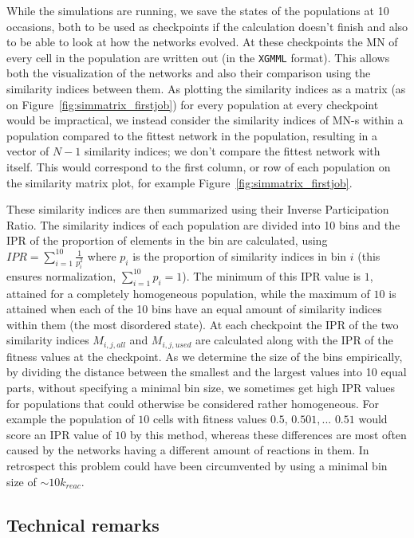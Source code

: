 \documentclass[a4paper,12pt]{article}
\begin{document}
While the simulations are running, we save the states of the populations at 10 occasions, both to be used as checkpoints if the calculation doesn't finish and also to be able to look at how the networks evolved. At these checkpoints the MN of every cell in the population are written out (in the \texttt{XGMML} format). This allows both the visualization of the networks and also their comparison using the similarity indices between them. As plotting the similarity indices as a matrix (as on Figure~\ref{fig:simmatrix_firstjob}) for every population at every checkpoint would be impractical, we instead consider the similarity indices of MN-s within a population compared to the fittest network in the population, resulting in a vector of $N-1$ similarity indices; we don't compare the fittest network with itself. This would correspond to the first column, or row of each population on the similarity matrix plot, for example Figure~\ref{fig:simmatrix_firstjob}.

These similarity indices are then summarized using their Inverse Participation Ratio. The similarity indices of each population are divided into 10 bins and the IPR of the proportion of elements in the bin are calculated, using $IPR= \sum^{10}_{i=1} \frac{1}{p_i^2} $ where $p_i$ is the proportion of similarity indices in bin $i$ (this ensures normalization, $ \sum^{10}_{i=1} p_i=1$). The minimum of this IPR value is $1$, attained for a completely homogeneous population, while the maximum of $10$ is attained when each of the 10 bins have an equal amount of similarity indices within them (the most disordered state). At each checkpoint the IPR of the two similarity indices $M_{i,j,all}$ and $M_{i,j,used}$ are calculated along with the IPR of the fitness values at the checkpoint. As we determine the size of the bins empirically, by dividing the distance between the smallest and the largest values into 10 equal parts, without specifying a minimal bin size, we sometimes get high IPR values for populations that could otherwise be considered rather homogeneous. For example the population of $10$ cells with fitness values $0.5$, $0.501, ...$ $0.51$ would score an IPR value of $10$ by this method, whereas these differences are most often caused by the networks having a different amount of reactions in them. In retrospect this problem could have been circumvented by using a minimal bin size of $\sim 10 k_{reac}$.




\subsection{Technical remarks}
\label{sub:technical_bits}
\end{document}
